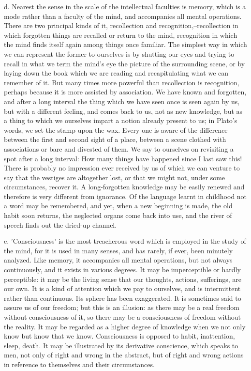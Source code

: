 d. Nearest the sense in the scale of the intellectual faculties
is memory, which is a mode rather than a faculty of the mind, and
accompanies all mental operations. There are two principal kinds of it,
recollection and recognition,--recollection in which forgotten things
are recalled or return to the mind, recognition in which the mind finds
itself again among things once familiar. The simplest way in which we
can represent the former to ourselves is by shutting our eyes and trying
to recall in what we term the mind's eye the picture of the
surrounding scene, or by laying down the book which we are reading and
recapitulating what we can remember of it. But many times more powerful
than recollection is recognition, perhaps because it is more assisted by
association. We have known and forgotten, and after a long interval the
thing which we have seen once is seen again by us, but with a different
feeling, and comes back to us, not as new knowledge, but as a thing to
which we ourselves impart a notion already present to us; in Plato's
words, we set the stamp upon the wax. Every one is aware of the
difference between the first and second sight of a place, between a
scene clothed with associations or bare and divested of them. We say to
ourselves on revisiting a spot after a long interval: How many things
have happened since I last saw this! There is probably no impression
ever received by us of which we can venture to say that the vestiges are
altogether lost, or that we might not, under some circumstances, recover
it. A long-forgotten knowledge may be easily renewed and therefore is
very different from ignorance. Of the language learnt in childhood not
a word may be remembered, and yet, when a new beginning is made, the
old habit soon returns, the neglected organs come back into use, and the
river of speech finds out the dried-up channel.

e. 'Consciousness' is the most treacherous word which is employed in
the study of the mind, for it is used in many senses, and has rarely,
if ever, been minutely analyzed. Like memory, it accompanies all mental
operations, but not always continuously, and it exists in various
degrees. It may be imperceptible or hardly perceptible: it may be the
living sense that our thoughts, actions, sufferings, are our own. It
is a kind of attention which we pay to ourselves, and is intermittent
rather than continuous. Its sphere has been exaggerated. It is sometimes
said to assure us of our freedom; but this is an illusion: as there
may be a real freedom without consciousness of it, so there may be a
consciousness of freedom without the reality. It may be regarded as a
higher degree of knowledge when we not only know but know that we know.
Consciousness is opposed to habit, inattention, sleep, death. It may be
illustrated by its derivative conscience, which speaks to men, not only
of right and wrong in the abstract, but of right and wrong actions in
reference to themselves and their circumstances.

